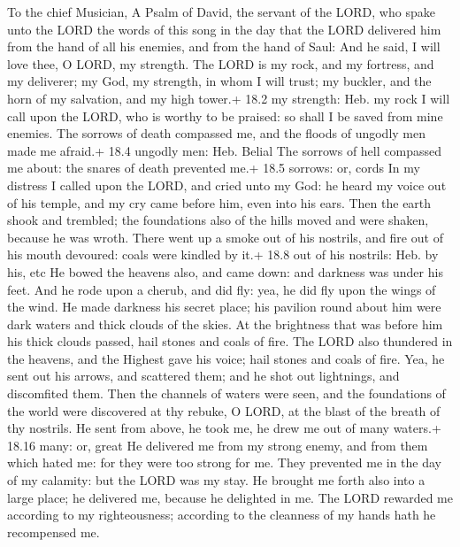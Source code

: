 To the chief Musician, A Psalm of David, the servant of the LORD, who
spake unto the LORD the words of this song in the day that the LORD
delivered him from the hand of all his enemies, and from the hand of
Saul: And he said,  I will love thee, O LORD, my strength.
 The LORD is my rock, and my fortress, and my deliverer; my
God, my strength, in whom I will trust; my buckler, and the horn of my
salvation, and my high tower.+ 18.2 my strength: Heb. my rock
 I will call upon the LORD, who is worthy to be praised: so
shall I be saved from mine enemies.  The sorrows of death
compassed me, and the floods of ungodly men made me afraid.+ 18.4
ungodly men: Heb. Belial  The sorrows of hell compassed me
about: the snares of death prevented me.+ 18.5 sorrows: or, cords
 In my distress I called upon the LORD, and cried unto my
God: he heard my voice out of his temple, and my cry came before him,
even into his ears.  Then the earth shook and trembled; the
foundations also of the hills moved and were shaken, because he was
wroth.  There went up a smoke out of his nostrils, and fire
out of his mouth devoured: coals were kindled by it.+ 18.8 out of his
nostrils: Heb. by his, etc  He bowed the heavens also, and
came down: and darkness was under his feet.  And he rode
upon a cherub, and did fly: yea, he did fly upon the wings of the wind.
 He made darkness his secret place; his pavilion round
about him were dark waters and thick clouds of the skies. 
At the brightness that was before him his thick clouds passed, hail
stones and coals of fire.  The LORD also thundered in the
heavens, and the Highest gave his voice; hail stones and coals of fire.
 Yea, he sent out his arrows, and scattered them; and he
shot out lightnings, and discomfited them.  Then the
channels of waters were seen, and the foundations of the world were
discovered at thy rebuke, O LORD, at the blast of the breath of thy
nostrils.  He sent from above, he took me, he drew me out
of many waters.+ 18.16 many: or, great  He delivered me
from my strong enemy, and from them which hated me: for they were too
strong for me.  They prevented me in the day of my
calamity: but the LORD was my stay.  He brought me forth
also into a large place; he delivered me, because he delighted in me.
 The LORD rewarded me according to my righteousness;
according to the cleanness of my hands hath he recompensed me.
